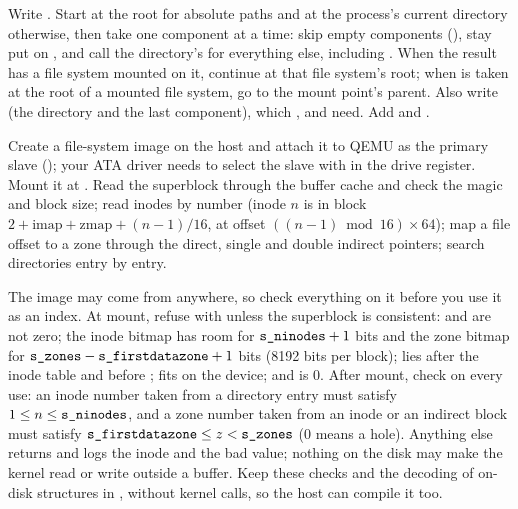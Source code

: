 \documentclass[11pt,a4paper]{article}
\begin{document}
Write . Start at the root for absolute paths and at the process's current directory
otherwise, then take one component at a time: skip empty components (\code{//}), stay put on , and call the
directory's  for everything else, including . When the result has a file system mounted on it,
continue at that file system's root; when  is taken at the root of a mounted file system, go to the mount
point's parent. Also write  (the directory and the last component), which , 
and  need. Add  and .

Create a file-system image on the host and attach it to QEMU as the primary slave (); your ATA driver needs
to select the slave with  in the drive register. Mount it at . Read the superblock through the
buffer cache and check the magic and block size; read inodes by number (inode $n$ is in block
$2 + \text{imap} + \text{zmap} + (n-1)/16$, at offset $((n-1) \bmod 16) \times 64$); map a file offset to a zone through the direct,
single and double indirect pointers; search directories entry by entry.

The image may come from anywhere, so check everything on it before you use it as an index. At mount, refuse with
 unless the superblock is consistent:  and  are not zero; the inode
bitmap has room for $\code{s_ninodes} + 1$ bits and the zone bitmap for $\code{s_zones} - \code{s_firstdatazone} + 1$
bits (8192 bits per block);  lies after the inode table and before ; 
fits on the device; and  is 0. After mount, check on every use: an inode number taken from a
directory entry must satisfy $1 \le n \le \code{s_ninodes}$, and a zone number taken from an inode or an indirect block
must satisfy $\code{s_firstdatazone} \le z < \code{s_zones}$ (0 means a hole). Anything else returns  and
logs the inode and the bad value; nothing on the disk may make the kernel read or write outside a buffer. Keep these
checks and the decoding of on-disk structures in , without kernel calls, so the host can
compile it too.
\end{document}
